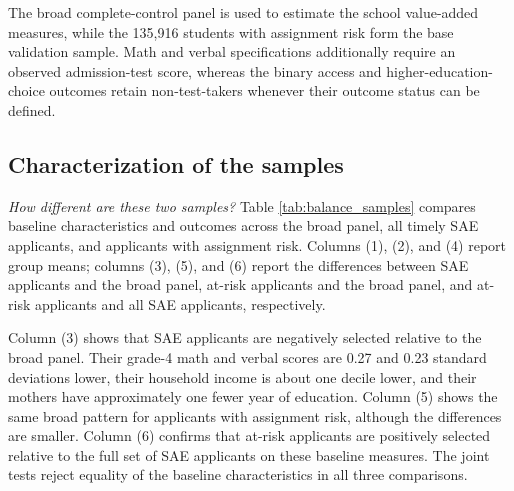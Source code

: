 \documentclass[a4paper, article, english, oneside, unknownkeysallowed, 12pt]{memoir}
\begin{document}


The broad complete-control panel is used to estimate the school value-added measures, while the 135,916 students with assignment risk form the base validation sample.
Math and verbal specifications additionally require an observed admission-test score, whereas the binary access and higher-education-choice outcomes retain non-test-takers whenever their outcome status can be defined.

\subsection{Characterization of the samples}

\textit{How different are these two samples?} Table \ref{tab:balance_samples} compares baseline characteristics and outcomes across the broad panel, all timely SAE applicants, and applicants with assignment risk.
Columns (1), (2), and (4) report group means; columns (3), (5), and (6) report the differences between SAE applicants and the broad panel, at-risk applicants and the broad panel, and at-risk applicants and all SAE applicants, respectively.




Column (3) shows that SAE applicants are negatively selected relative to the broad panel.
Their grade-4 math and verbal scores are 0.27 and 0.23 standard deviations lower, their household income is about one decile lower, and their mothers have approximately one fewer year of education.
Column (5) shows the same broad pattern for applicants with assignment risk, although the differences are smaller.
Column (6) confirms that at-risk applicants are positively selected relative to the full set of SAE applicants on these baseline measures.
The joint tests reject equality of the baseline characteristics in all three comparisons.
\end{document}
